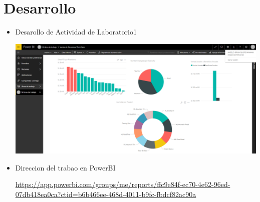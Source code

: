 \section{Desarrollo } 

\begin{itemize}



\item Desarollo de Actividad de Laboratorio1
\begin{center}
\includegraphics[scale=0.30]{./Imagenes/28.png}
\end{center}

\item Direccion del trabao en PowerBI

\begin{center}
\href{https://app.powerbi.com/groups/me/reports/ffc9e84f-ec70-4e62-96ed-07db418ea0ca?ctid=b6b466ee-468d-4011-b9fc-fbdcf82ac90a}{https://app.powerbi.com/groups/me/reports/ffc9e84f-ec70-4e62-96ed-07db418ea0ca?ctid=b6b466ee-468d-4011-b9fc-fbdcf82ac90a}
\end{center}





\end{itemize}







